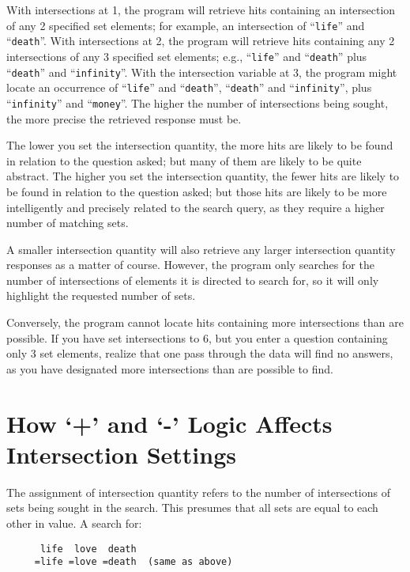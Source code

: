 With intersections at 1, the program will retrieve hits containing an
intersection of any 2 specified set elements; for example, an
intersection of ``\verb`life`'' and ``\verb`death`''.  With
intersections at 2, the program will retrieve hits containing any 2
intersections of any 3 specified set elements; e.g., ``\verb`life`''
and ``\verb`death`'' plus ``\verb`death`'' and ``\verb`infinity`''.
With the intersection variable at 3, the program might locate an
occurrence of ``\verb`life`'' and ``\verb`death`'', ``\verb`death`''
and ``\verb`infinity`'', plus ``\verb`infinity`'' and
``\verb`money`''.  The higher the number of intersections being
sought, the more precise the retrieved response must be.

The lower you set the intersection quantity, the more hits are likely
to be found in relation to the question asked; but many of them are
likely to be quite abstract.  The higher you set the intersection
quantity, the fewer hits are likely to be found in relation to the
question asked; but those hits are likely to be more intelligently and
precisely related to the search query, as they require a higher number
of matching sets.

A smaller intersection quantity will also retrieve any larger
intersection quantity responses as a matter of course.  However, the
program only searches for the number of intersections of elements it
is directed to search for, so it will only highlight the requested
number of sets.

Conversely, the program cannot locate hits containing more
intersections than are possible.  If you have set intersections to 6,
but you enter a question containing only 3 set elements, realize that
one pass through the data will find no answers, as you have designated
more intersections than are possible to find.


\section{How `+' and `-' Logic Affects Intersection Settings}

The assignment of intersection quantity refers to the number of
intersections of sets being sought in the search.  This presumes that
all sets are equal to each other in value.  A search for:

\begin{verbatim}
      life  love  death
     =life =love =death  (same as above)
\end{verbatim}

